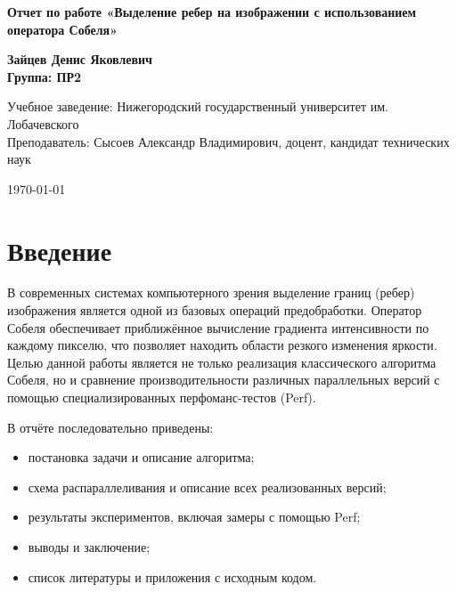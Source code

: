 \documentclass[12pt]{article}
\begin{document}
\begin{titlepage}
\begin{center}
    \vspace*{1cm}

    \textbf{\Large Отчет по работе «Выделение ребер на изображении с использованием оператора Собеля»}

    \vspace{1.5cm}

    \textbf{Зайцев Денис Яковлевич \\
    Группа: ПР2}

    \vfill

    Учебное заведение: Нижегородский государственный университет им. Лобачевского \\
    Преподаватель: Сысоев Александр Владимирович, доцент, кандидат технических наук

    \vspace{0.8cm}

    \today

\end{center}
\end{titlepage}

\tableofcontents
\newpage


\section*{Введение}

В современных системах компьютерного зрения выделение границ (ребер) изображения является одной из базовых операций предобработки. Оператор Собеля обеспечивает приближённое вычисление градиента интенсивности по каждому пикселю, что позволяет находить области резкого изменения яркости. Целью данной работы является не только реализация классического алгоритма Собеля, но и сравнение производительности различных параллельных версий с помощью специализированных перфоманс-тестов (Perf). 

\vspace{0.5em}

В отчёте последовательно приведены:
\begin{itemize}
    \item постановка задачи и описание алгоритма;
    \item схема распараллеливания и описание всех реализованных версий;
    \item результаты экспериментов, включая замеры с помощью Perf;
    \item выводы и заключение;
    \item список литературы и приложения с исходным кодом.
\end{itemize}
\end{document}

